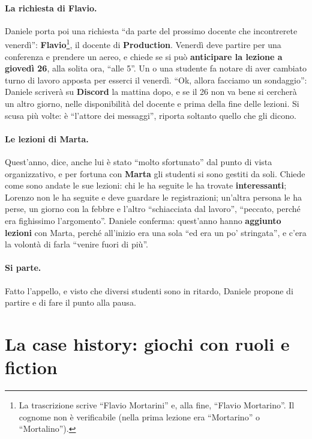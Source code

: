 \paragraph{La richiesta di Flavio.} Daniele porta poi una richiesta ``da parte del prossimo
docente che incontrerete venerdì'': \textbf{Flavio}\footnote{La trascrizione scrive ``Flavio
Mortarini'' e, alla fine, ``Flavio Mortarino''. Il cognome non è verificabile (nella prima
lezione era ``Mortarino'' o ``Mortalino'').}, il docente di \textbf{Production}. Venerdì deve
partire per una conferenza e prendere un aereo, e chiede se si può \textbf{anticipare la
lezione a giovedì 26}, alla solita ora, ``alle 5''. Un o una studente fa notare di aver
cambiato turno di lavoro apposta per esserci il venerdì. ``Ok, allora facciamo un sondaggio'':
Daniele scriverà su \textbf{Discord} la mattina dopo, e se il 26 non va bene si cercherà un
altro giorno, nelle disponibilità del docente e prima della fine delle lezioni. Si scusa più
volte: è ``l'attore dei messaggi'', riporta soltanto quello che gli dicono.

\paragraph{Le lezioni di Marta.} Quest'anno, dice, anche lui è stato ``molto sfortunato''
dal punto di vista organizzativo, e per fortuna con \textbf{Marta} gli studenti si sono
gestiti da soli. Chiede come sono andate le sue lezioni: chi le ha seguite le ha trovate
\textbf{interessanti}; Lorenzo non le ha seguite e deve guardare le registrazioni; un'altra
persona le ha perse, un giorno con la febbre e l'altro ``schiacciata dal lavoro'', ``peccato,
perché era fighissimo l'argomento''. Daniele conferma: quest'anno hanno \textbf{aggiunto
lezioni} con Marta, perché all'inizio era una sola ``ed era un po' stringata'', e c'era la
volontà di farla ``venire fuori di più''.

\paragraph{Si parte.} Fatto l'appello, e visto che diversi studenti sono in ritardo, Daniele
propone di partire e di fare il punto alla pausa.

\section{La case history: giochi con ruoli e fiction}
\label{a16:sec:case}

